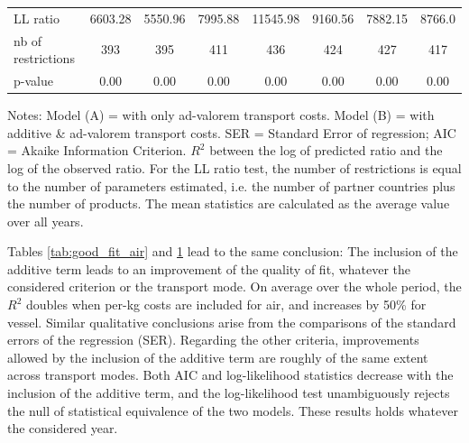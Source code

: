 \documentclass[a4paper,11pt]{article}
\begin{document}
\begin{table}[htbp]
{\begin{center}
\begin{tabular}{l|cccccc|c}
    LL ratio & \multicolumn{1}{c}{6603.28} & \multicolumn{1}{c}{5550.96} & \multicolumn{1}{c}{7995.88} & \multicolumn{1}{c}{11545.98} & 9160.56 & \multicolumn{1}{c}{7882.15} & 8766.0 \\
    nb of restrictions & \multicolumn{1}{c}{393} & \multicolumn{1}{c}{395} & \multicolumn{1}{c}{411} & \multicolumn{1}{c}{436} & 424   & \multicolumn{1}{c}{427} & 417 \\
    p-value& \multicolumn{1}{c}{0.00} & \multicolumn{1}{c}{0.00} & \multicolumn{1}{c}{0.00} & \multicolumn{1}{c}{0.00} & 0.00  & \multicolumn{1}{c}{0.00} & 0.00 \\
    \hline \hline
    \end{tabular}%
    \end{center}}
  \label{tab:good_fit_vessel}%
  \parbox[l]{15cm}{\footnotesize{Notes: Model (A) = with only ad-valorem transport costs.
Model (B) = with additive \& ad-valorem transport costs.
SER = Standard Error of regression; AIC = Akaike Information Criterion.
$R^{2}$ between the log of predicted ratio and the log of the observed ratio.
For the LL ratio test, the number of restrictions is equal to the number of parameters estimated, i.e. the number of partner countries plus the number of products.
The mean statistics are calculated as the average value over all years.
}}
\end{table}%


Tables \ref{tab:good_fit_air} and \ref{tab:good_fit_vessel} lead to the same conclusion: The inclusion of the additive term leads to an improvement of the quality of fit, whatever the considered criterion or the transport mode.
On average over the whole period, the $R^{2}$ doubles when per-kg costs are included for air, and increases by 50\% for vessel.
Similar qualitative conclusions arise from the comparisons of the standard errors of the regression (SER).
Regarding the other criteria, improvements allowed by the inclusion of the additive term are roughly of the same extent across transport modes.
Both AIC and log-likelihood statistics decrease with the inclusion of the additive term, and the log-likelihood test unambiguously rejects the null of statistical equivalence of the two models.
These results holds whatever the considered year.\smallskip
\end{document}
